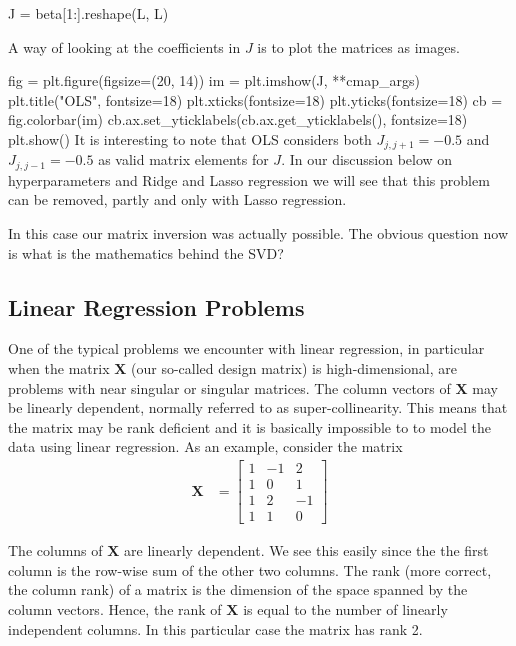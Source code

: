\documentclass[%
oneside,                 %
final,                   %
10pt]{article}
\begin{document}
\bpycod
J = beta[1:].reshape(L, L)
\epycod

A way of looking at the coefficients in $J$ is to plot the matrices as images.


\bpycod
fig = plt.figure(figsize=(20, 14))
im = plt.imshow(J, **cmap_args)
plt.title("OLS", fontsize=18)
plt.xticks(fontsize=18)
plt.yticks(fontsize=18)
cb = fig.colorbar(im)
cb.ax.set_yticklabels(cb.ax.get_yticklabels(), fontsize=18)
plt.show()
\epycod
It is interesting to note that OLS
considers both $J_{j, j + 1} = -0.5$ and $J_{j, j - 1} = -0.5$ as
valid matrix elements for $J$.
In our discussion below on hyperparameters and Ridge and Lasso regression we will see that
this problem can be removed, partly and only with Lasso regression. 

In this case our matrix inversion was actually possible. The obvious question now is what is the mathematics behind the SVD?


\subsection{Linear Regression Problems}

One of the typical problems we encounter with linear regression, in particular 
when the matrix $\bm{X}$ (our so-called design matrix) is high-dimensional, 
are problems with near singular or singular matrices. The column vectors of $\bm{X}$ 
may be linearly dependent, normally referred to as super-collinearity.  
This means that the matrix may be rank deficient and it is basically impossible to 
to model the data using linear regression. As an example, consider the matrix
\begin{align*}
\mathbf{X} & =  \left[
\begin{array}{rrr}
1 & -1 & 2
\\
1 & 0 & 1
\\
1 & 2  & -1
\\
1 & 1  & 0
\end{array} \right]
\end{align*}

The columns of $\bm{X}$ are linearly dependent. We see this easily since the 
the first column is the row-wise sum of the other two columns. The rank (more correct,
the column rank) of a matrix is the dimension of the space spanned by the
column vectors. Hence, the rank of $\mathbf{X}$ is equal to the number
of linearly independent columns. In this particular case the matrix has rank 2.
\end{document}
